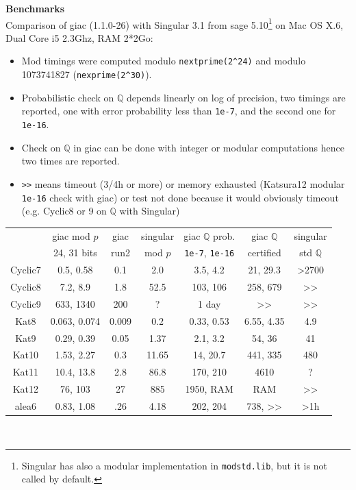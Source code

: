 \documentclass[a4paper,11pt]{article}
\newcommand{\Q}{{\mathbb{Q}}}
\begin{document}
\begin{giacjshere}
{\bf Benchmarks}\\
Comparison of giac (1.1.0-26) with Singular 3.1 from sage
5.10\footnote{Singular has also a modular implementation in
  {\tt modstd.lib}, but it is not called by default.}
on Mac OS X.6, Dual Core i5 2.3Ghz, RAM 2*2Go:
\begin{itemize}
\item Mod timings were computed modulo \verb|nextprime(2^24)|
and modulo 1073741827 (\verb|nexprime(2^30)|).
\item Probabilistic check on $\Q$ depends linearly on log of precision, two
timings are reported, one with error probability less than \verb|1e-7|, and
the second one for \verb|1e-16|.
\item Check on $\Q$ in giac can be done with integer or modular computations
hence two times are reported.
\item \verb|>>| means timeout (3/4h or more) or memory exhausted
(Katsura12 modular \verb|1e-16| check with giac) or test not done because
it would obviously timeout (e.g. Cyclic8 or 9 on $\Q$ with Singular)
\end{itemize}
\begin{tabular}{|c|c|c|c||c|c|c|} \hline
        & giac mod $p$ & giac & singular & giac $\Q$ prob. & giac $\Q$  & singular \\ 
        & 24, 31 bits & run2 & mod $p$ & \verb|1e-7|, \verb|1e-16| &
                                                                     certified & std $\Q$ \\ \hline
Cyclic7 & 0.5, 0.58 & 0.1&2.0 & 3.5, 4.2 & 21, 29.3 & >2700 \\
Cyclic8 & 7.2, 8.9 & 1.8 &52.5 & 103, 106 & 258, 679 & >> \\
Cyclic9 & 633, 1340 & 200 & ? & 1 day & >> & >> \\ \hline
Kat8 & 0.063, 0.074 & 0.009& 0.2 & 0.33, 0.53 & 6.55, 4.35 & 4.9\\
Kat9 & 0.29, 0.39 & 0.05 &1.37 & 2.1, 3.2 & 54, 36& 41\\
Kat10 & 1.53, 2.27 & 0.3& 11.65 & 14, 20.7 & 441, 335 &  480 \\
Kat11 & 10.4, 13.8 & 2.8 & 86.8 & 170, 210& 4610 & ? \\
Kat12 & 76, 103 & 27 & 885 & 1950, RAM & RAM & >> \\ \hline
alea6 & 0.83, 1.08& .26 & 4.18 & 202, 204& 738, >> & >1h\\
\hline 
\end{tabular}\\

\end{giacjshere}
\end{document}
